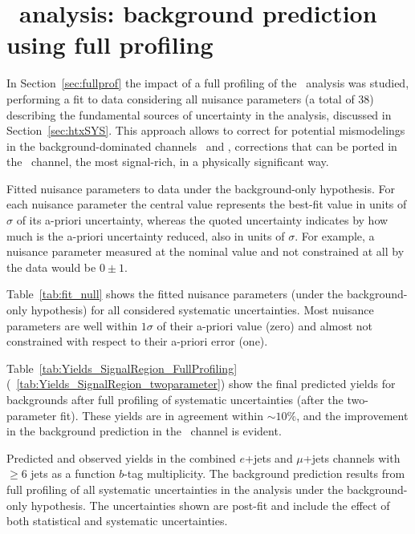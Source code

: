 \clearpage{\pagestyle{empty}\cleardoublepage}

\chapter{\htx\ analysis: background prediction using full profiling}
\label{app:fullprofiling}

In Section~\ref{sec:fullprof} the impact of a full
profiling of the \htx\ analysis was studied,
performing a fit to data considering all nuisance parameters 
(a total of 38) describing the fundamental
sources of uncertainty in the analysis, discussed
in Section~\ref{sec:htxSYS}. This approach allows 
to correct for potential mismodelings in the 
background-dominated channels \chii\ and \chiii,
corrections that can be ported in the \chiv\ channel,
the most signal-rich, in a physically significant way.
\begin{table}[htb]
\begin{center}
%
\footnotesize

\caption{\label{tab:fit_null}
Fitted nuisance parameters to data under the background-only hypothesis. 
For each nuisance parameter the central value represents the
best-fit value in units of $\sigma$ of its a-priori uncertainty, 
whereas the quoted uncertainty indicates by how much is the a-priori uncertainty
reduced, also in units of $\sigma$. For example, a nuisance parameter 
measured at the nominal value and not constrained at all by the data would
be $0\pm 1$.}
\end{center}
\end{table}
Table~\ref{tab:fit_null} shows the fitted nuisance 
parameters (under the background-only hypothesis) 
for all considered systematic uncertainties. 
Most nuisance parameters are well within
$1\sigma$ of their a-priori value (zero) and almost 
not constrained with respect to their a-priori error (one). 


Table~\ref{tab:Yields_SignalRegion_FullProfiling} 
(~\ref{tab:Yields_SignalRegion_twoparameter})
show the final predicted yields for backgrounds
after full profiling of systematic uncertainties
(after the two-parameter fit).
These yields are in agreement within $\sim 10\%$,
and the improvement in the background prediction
in the \chiv\ channel is evident.

\begin{table}[htbp]
\small
\begin{center}
\scriptsize

\caption{\label{tab:Yields_SignalRegion_FullProfiling} Predicted and observed yields in the combined $e$+jets and $\mu$+jets channels with $\geq 6$ jets 
as a function $b$-tag multiplicity. The background prediction results from full profiling of all systematic uncertainties in the analysis under the background-only hypothesis. The uncertainties shown are post-fit and include the effect of both statistical and systematic uncertainties.}
\end{center}
\end{table}

